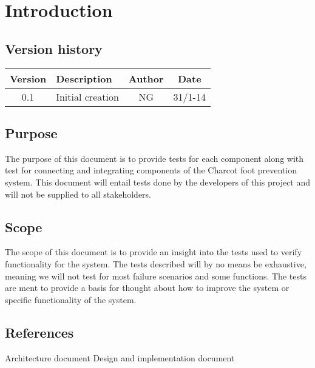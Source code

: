 \chapter{Introduction}
\section{Version history}
\begin{table}[H]
\begin{tabular}{|c|p{9cm}|c|c|}
\hline
Version & Description & Author & Date\\ \hline
0.1 & Initial creation & NG & 31/1-14 \\
\hline
\end{tabular}
\end{table}

\section{Purpose}
The purpose of this document is to provide tests for each component along with test for connecting and integrating components of the Charcot foot prevention system. This document will entail tests done by the developers of this project and will not be supplied to all stakeholders.

\section{Scope}
The scope of this document is to provide an insight into the tests used to verify functionality for the system. The tests described will by no means be exhaustive, meaning we will not test for most failure scenarios and some functions. The tests are ment to provide a basis for thought about how to improve the system or specific functionality of the system.

\section{References}
Architecture document
Design and implementation document

